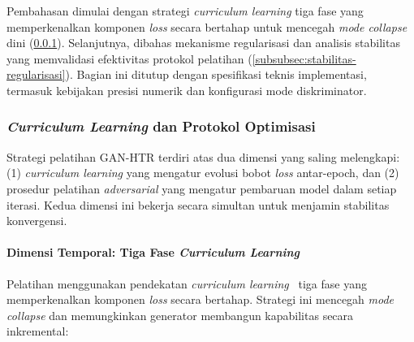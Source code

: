 \documentclass[12pt,a4paper]{article}
\begin{document}
Pembahasan dimulai dengan strategi \textit{curriculum learning} tiga fase yang memperkenalkan komponen \textit{loss} secara bertahap untuk mencegah \textit{mode collapse} dini (\ref{subsubsec:curriculum-learning}). Selanjutnya, dibahas mekanisme regularisasi dan analisis stabilitas yang memvalidasi efektivitas protokol pelatihan (\ref{subsubsec:stabilitas-regularisasi}). Bagian ini ditutup dengan spesifikasi teknis implementasi, termasuk kebijakan presisi numerik dan konfigurasi mode diskriminator.

\subsubsection{\textit{Curriculum Learning} dan Protokol Optimisasi}
\label{subsubsec:curriculum-learning}

Strategi pelatihan GAN-HTR terdiri atas dua dimensi yang saling melengkapi: (1) \textit{curriculum learning} yang mengatur evolusi bobot \textit{loss} antar-epoch, dan (2) prosedur pelatihan \textit{adversarial} yang mengatur pembaruan model dalam setiap iterasi. Kedua dimensi ini bekerja secara simultan untuk menjamin stabilitas konvergensi.

\paragraph{Dimensi Temporal: Tiga Fase \textit{Curriculum Learning}}

Pelatihan menggunakan pendekatan \textit{curriculum learning}~\parencite{bengio2009} tiga fase yang memperkenalkan komponen \textit{loss} secara bertahap. Strategi ini mencegah \textit{mode collapse} dan memungkinkan generator membangun kapabilitas secara inkremental:
\end{document}

